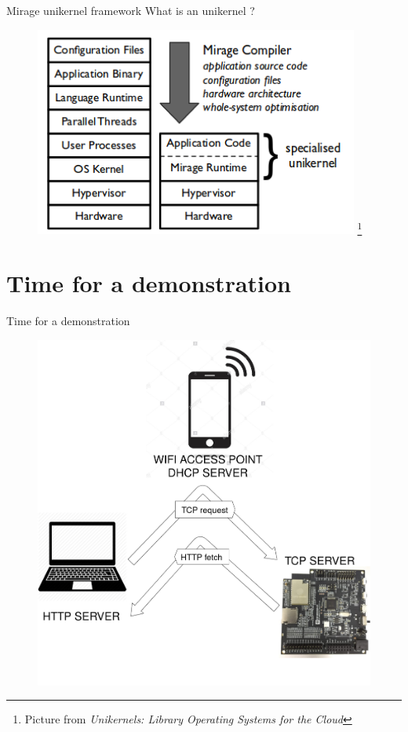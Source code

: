 \documentclass[10pt]{beamer}
\begin{document}
\begin{frame}{Mirage unikernel framework}
What is an unikernel ?
\begin{figure}
\includegraphics[width=0.95\textwidth]{unikernel.png}
\let\thefootnote\relax\footnote{Picture from \textit{Unikernels: Library Operating Systems for the Cloud}}
\end{figure}
\end{frame}

\section{Time for a demonstration}
\begin{frame}{Time for a demonstration}
\begin{figure}
    \centering
    \includegraphics[height=0.95\textheight]{demo.png}
\end{figure}
\end{frame}
\end{document}
